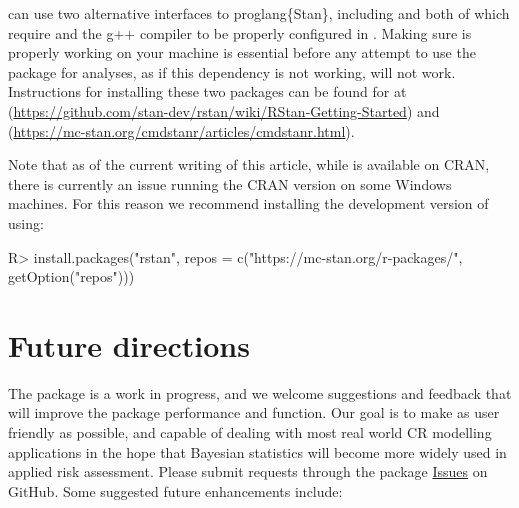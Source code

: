 \documentclass[
  shortnames]{jss}
\begin{document}
 can use two alternative interfaces to proglang\{Stan\}, including  \citep{rstan2021} and  \citep{cmdstanr2022}
both of which require  and the g++ compiler to be properly configured in .
Making sure  is properly working on your machine is essential before any
attempt to use the  package for analyses, as if this dependency is not
working,  will not work. Instructions for installing these two packages can be found for  at (\url{https://github.com/stan-dev/rstan/wiki/RStan-Getting-Started}) and  (\url{https://mc-stan.org/cmdstanr/articles/cmdstanr.html}).

Note that as of the current writing of this article, while  is available on CRAN, there is currently an issue running the CRAN version on some Windows machines. For this reason we recommend installing the development version of  using:

\begin{CodeChunk}
\begin{CodeInput}
R> install.packages("rstan", repos = c("https://mc-stan.org/r-packages/", getOption("repos")))
\end{CodeInput}
\end{CodeChunk}

\hypertarget{future-directions}{%
\section{Future directions}\label{future-directions}}

The  package is a work in progress, and we welcome suggestions and feedback that will improve the package performance and function. Our goal is to make  as user friendly as possible, and capable of dealing with most real world CR modelling applications in the hope that Bayesian statistics will become more widely used in applied risk assessment. Please submit requests through the package \href{https://github.com/open-AIMS/bayesnec/issues}{Issues} on GitHub. Some suggested future enhancements include:
\end{document}
